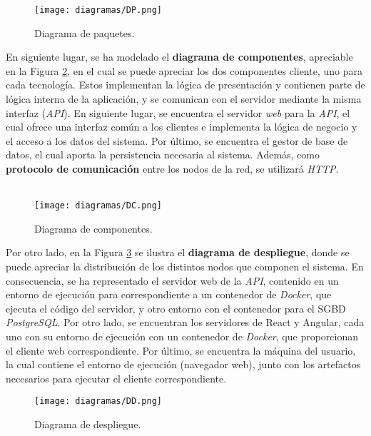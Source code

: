 \documentclass[11pt, a4paper, titlepage]{article}
\begin{document}
\begin{figure}[!h]
    \centering
    \texttt{[image: diagramas/DP.png]}
    \caption{Diagrama de paquetes.}
    \label{ref:paquetes}
\end{figure}

\newpage

En siguiente lugar, se ha modelado el \textbf{diagrama de componentes}, apreciable en la Figura \ref{ref:componentes}, en el cual se puede apreciar los dos componentes cliente, uno para cada tecnología. Estos implementan la lógica de presentación y contienen parte de lógica interna de la aplicación, y se comunican con el servidor mediante la misma interfaz (\textit{API}). En siguiente lugar, se encuentra el servidor \textit{web} para la \textit{API}, el cual ofrece una interfaz común a los clientes e implementa la lógica de negocio y el acceso a los datos del sistema. Por último, se encuentra el gestor de base de datos, el cual aporta la persistencia necesaria al sistema. Además, como \textbf{protocolo de comunicación} entre los nodos de la red, se utilizará \textit{HTTP}. \\ \\

\begin{figure}[!h]
    \centering
    \texttt{[image: diagramas/DC.png]}
    \caption{Diagrama de componentes.}
    \label{ref:componentes}
\end{figure}

\newpage

Por otro lado, en la Figura \ref{ref:despliegue} se ilustra el \textbf{diagrama de despliegue}, donde se puede apreciar la distribución de los distintos nodos que componen el sistema. En consecuencia, se ha representado el servidor web de la \textit{API}, contenido en un entorno de ejecución para correspondiente a un contenedor de \textit{Docker}, que ejecuta el código del servidor, y otro entorno con el contenedor para el SGBD \textit{PostgreSQL}. Por otro lado, se encuentran los servidores de React y Angular, cada uno con su entorno de ejecución con un contenedor de \textit{Docker}, que proporcionan el cliente web correspondiente. Por último, se encuentra la máquina del usuario, la cual contiene el entorno de ejecución (navegador web), junto con los artefactos necesarios para ejecutar el cliente correspondiente. \\

\begin{figure}[!h]
    \centering
    \texttt{[image: diagramas/DD.png]}
    \caption{Diagrama de despliegue.}
    \label{ref:despliegue}
\end{figure}
\end{document}
